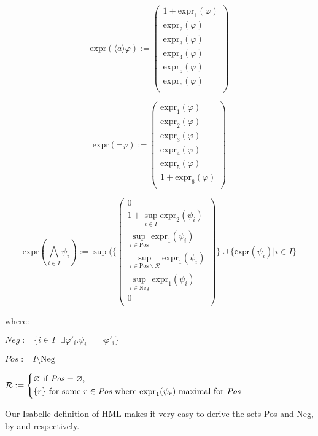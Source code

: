 \begin{isabellebody}
\begin{isamarkuptext}
\[
\text{expr}(\langle a \rangle \varphi) :=
\begin{pmatrix}
1 + \text{expr}_1(\varphi) \\
\text{expr}_2(\varphi) \\
\text{expr}_3(\varphi) \\
\text{expr}_4(\varphi) \\
\text{expr}_5(\varphi) \\
\text{expr}_6(\varphi) \\
\end{pmatrix}
\]

\[
\text{expr}(\neg \varphi) := 
\begin{pmatrix}
\text{expr}_1(\varphi) \\
\text{expr}_2(\varphi) \\
\text{expr}_3(\varphi) \\
\text{expr}_4(\varphi) \\
\text{expr}_5(\varphi) \\
1 + \text{expr}_6(\varphi) \\
\end{pmatrix}
\]

\[
\text{expr}\left( \bigwedge_{i \in I} \psi_i \right) := \sup(\{
\begin{pmatrix}
0 \\
1 + \sup_{i \in I} \text{expr}_2(\psi_i) \\
\sup_{i \in \text{Pos}} \text{expr}_1(\psi_i) \\
\sup_{i \in \text{Pos} \backslash \mathcal{R}} \text{expr}_1(\psi_i) \\
\sup_{i \in \text{Neg}} \text{expr}_1(\psi_i) \\
0 \\
\end{pmatrix} \} \cup \{\textsf{expr}(\psi_i) | i \in I\} 
\]

where:

$\textit{Neg} := \{i \in I \, | \, \exists \varphi'_i. \psi_i = \neg \varphi'_i\}$

$\textit{Pos} := I \setminus \text{Neg}$

$\mathcal{R} := \left\{
\begin{aligned}
&\varnothing \text{ if } \textit{Pos} = \varnothing, \\
&\{ r \} \text{ for some } r \in \textit{Pos} \text{ where } \text{expr}_1(\psi_r) \text{ maximal for \textit{Pos}}
\end{aligned}
\right.$

Our Isabelle definition of HML makes it very easy to derive the sets Pos and Neg, by  and  respectively.


\end{isamarkuptext}
\end{isabellebody}
